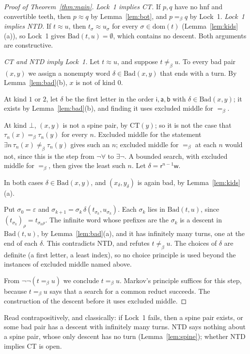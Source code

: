 \documentclass[11pt]{amsart}
\theoremstyle{definition}
\newcommand{\conv}{=_\beta}
\newcommand{\nconv}{\neq_\beta}
\newcommand{\dom}{\mathrm{dom}}
\newcommand{\Bad}{\mathrm{Bad}}
\newcommand{\li}{\mathsf i}
\newcommand{\la}{\mathsf a}
\newcommand{\lb}{\mathsf b}
\newcommand{\lr}{\mathsf r}
\newcommand{\lw}{\mathsf w}
\newcommand{\CT}{\mathrm{CT}}
\begin{document}
\begin{proof}[Proof of Theorem~\ref{thm:main}]
\emph{Lock~1 implies CT.} If $p,q$ have no hnf and convertible teeth, then $p\approx q$ by
Lemma~\ref{lem:bot}, and $p\conv q$ by Lock~1. \emph{Lock~1 implies NTD.} If $t\approx u$, then
$t_\sigma\approx u_\sigma$ for every $\sigma\in\dom(t)$ (Lemma~\ref{lem:kids}(a)), so Lock~1 gives
$\Bad(t,u)=\emptyset$, which contains no descent. Both arguments are constructive.

\emph{CT and NTD imply Lock~1.} Let $t\approx u$, and suppose $t\nconv u$. To every bad pair $(x,y)$ we
assign a nonempty word $\delta\in\Bad(x,y)$ that ends with a turn. By Lemma~\ref{lem:bad}(b), $x$ is not
of kind $0$.

At kind $1$ or $2$, let $\delta$ be the first letter in the order $\li,\la,\lb$ with
$\delta\in\Bad(x,y)$; it exists by Lemma~\ref{lem:bad}(b), and finding it uses excluded middle for
$\conv$.

At kind $\bot$, $(x,y)$ is not a spine pair, by $\CT(y)$; so it is not the case that
$\tau_n(x)\conv\tau_n(y)$ for every $n$. Excluded middle for the statement
$\exists n\,\tau_n(x)\nconv\tau_n(y)$ gives such an $n$; excluded middle for $\conv$ at each $n$
would not, since this is the step from $\neg\forall$ to $\exists\neg$. A bounded search, with
excluded middle for $\conv$, then gives the least such $n$. Let $\delta=\lr^{n-1}\lw$.

In both cases $\delta\in\Bad(x,y)$, and $(x_\delta,y_\delta)$ is again bad, by
Lemma~\ref{lem:kids}(a).

Put $\sigma_0=\varepsilon$ and $\sigma_{k+1}=\sigma_k\,\delta(t_{\sigma_k},u_{\sigma_k})$. Each
$\sigma_k$ lies in $\Bad(t,u)$, since $(t_{\sigma_k})_\rho=t_{\sigma_k\rho}$. The infinite word whose
prefixes are the $\sigma_k$ is a descent in $\Bad(t,u)$, by Lemma~\ref{lem:bad}(a), and it has
infinitely many turns, one at the end of each $\delta$. This contradicts NTD, and refutes
$t\nconv u$. The choices of $\delta$ are definite (a first letter, a least index), so no choice
principle is used beyond the instances of excluded middle named above.

From $\neg\neg(t\conv u)$ we conclude $t\conv u$. Markov's principle suffices for this step,
because $t\conv u$ says that a search for a common reduct succeeds. The construction of the descent
before it uses excluded middle.
\end{proof}

Read contrapositively, and classically: if Lock~1 fails, then a spine pair exists, or some bad pair
has a descent with infinitely many turns. NTD says nothing about a spine pair, whose only descent has
no turn (Lemma~\ref{lem:spine}); whether NTD implies CT is open.
\end{document}

